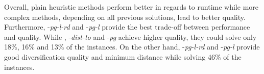 Overall, plain heuristic methods perform better in regards to runtime 
while more complex methods, depending on all previous solutions, lead to better quality. 
%
Furthermore, -\textit{pg-l-rd } and -\textit{pg-l} provide the best trade-off between performance and quality. 
%
While , -\textit{dist-to} and -\textit{pg} achieve higher quality, they could solve only 18\%, 16\% and 13\% of the instances. 
%
On the other hand, -\textit{pg-l-rd } and -\textit{pg-l} provide good diversification quality and minimum distance while solving 46\% of the instances. 
%


